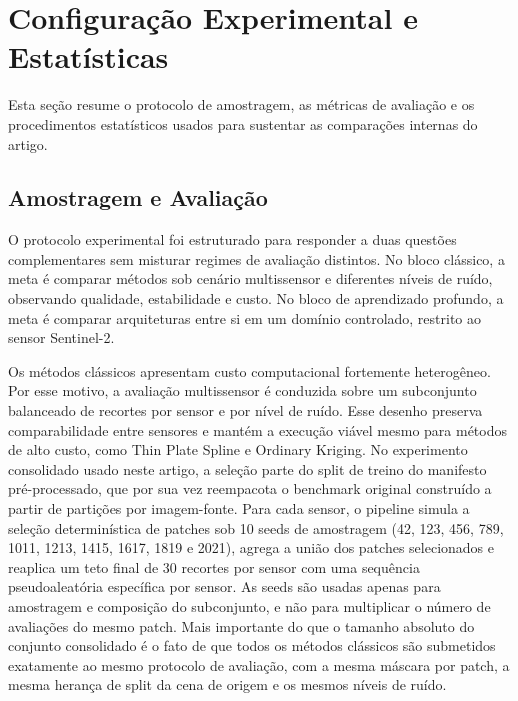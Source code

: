 \section{Configuração Experimental e Estatísticas}
\label{sec:experimental}

Esta seção resume o protocolo de amostragem, as métricas de avaliação e os procedimentos estatísticos usados para sustentar as comparações internas do artigo.

\subsection{Amostragem e Avaliação}

O protocolo experimental foi estruturado para responder a duas questões complementares sem misturar regimes de avaliação distintos.
No bloco clássico, a meta é comparar métodos sob cenário multissensor e diferentes níveis de ruído, observando qualidade, estabilidade e custo.
No bloco de aprendizado profundo, a meta é comparar arquiteturas entre si em um domínio controlado, restrito ao sensor Sentinel-2.

Os métodos clássicos apresentam custo computacional fortemente heterogêneo.
Por esse motivo, a avaliação multissensor é conduzida sobre um subconjunto balanceado de recortes por sensor e por nível de ruído.
Esse desenho preserva comparabilidade entre sensores e mantém a execução viável mesmo para métodos de alto custo, como Thin Plate Spline e Ordinary Kriging.
No experimento consolidado usado neste artigo, a seleção parte do split de treino do manifesto pré-processado, que por sua vez reempacota o benchmark original construído a partir de partições por imagem-fonte.
Para cada sensor, o pipeline simula a seleção determinística de patches sob 10 seeds de amostragem (42, 123, 456, 789, 1011, 1213, 1415, 1617, 1819 e 2021), agrega a união dos patches selecionados e reaplica um teto final de 30 recortes por sensor com uma sequência pseudoaleatória específica por sensor.
As seeds são usadas apenas para amostragem e composição do subconjunto, e não para multiplicar o número de avaliações do mesmo patch.
Mais importante do que o tamanho absoluto do conjunto consolidado é o fato de que todos os métodos clássicos são submetidos exatamente ao mesmo protocolo de avaliação, com a mesma máscara por patch, a mesma herança de split da cena de origem e os mesmos níveis de ruído.


